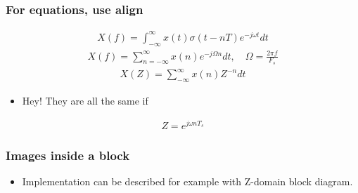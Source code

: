 \documentclass[logo=bluequo,normaltitle]{aaltoslides}
\begin{document}
\begin{frame}[t]
    \frametitle{For equations, use align}
    \begin{align*}
        X(f)=\int_{-\infty}^{\infty} x(t)\sigma\left(t-nT\right)e^{-j\omega t} dt
    \end{align*}
    \begin{align*}
        X(f)=\sum_{n=-\infty}^{\infty}x\left(n\right)e^{-j\Omega n} dt,\quad
        \Omega=\frac{2\pi f}{F_s}
    \end{align*}
    \begin{align*}
        X(Z)=\sum_{-\infty}^{\infty} x\left(n\right)Z^{-n}dt
    \end{align*}
        \begin{itemize}
            \item Hey! They are all the same if
        \end{itemize}
        \begin{align*}
            Z=e^{j\omega n T_s}
        \end{align*}
\end{frame}


\begin{frame}[t]
    \frametitle{Images inside a block}
\begin{itemize}
        \item  Implementation can be described for example with Z-domain block
            diagram. 
    \end{itemize}
    \begin{minipage}[t]{.45\linewidth}
    \end{minipage}
    \hfill
    \begin{minipage}[t]{.45\linewidth}
    \end{minipage}
\end{frame}


    
\end{document}

